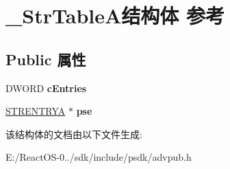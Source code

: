 \hypertarget{struct___str_table_a}{}\section{\+\_\+\+Str\+Table\+A结构体 参考}
\label{struct___str_table_a}
\subsection*{Public 属性}
\begin{DoxyCompactItemize}
\item 
\mbox{\label{struct___str_table_a_a35bdf510e6fc3a5224e10bd97503ae7b}} 
D\+W\+O\+RD {\bfseries c\+Entries}
\item 
\mbox{\label{struct___str_table_a_ac19571ab9d0715e15bf4e9509afe5055}} 
\hyperlink{struct___str_entry_a}{S\+T\+R\+E\+N\+T\+R\+YA} $\ast$ {\bfseries pse}
\end{DoxyCompactItemize}


该结构体的文档由以下文件生成\+:\begin{DoxyCompactItemize}
\item 
E\+:/\+React\+O\+S-\/0../sdk/include/psdk/advpub.\+h\end{DoxyCompactItemize}

